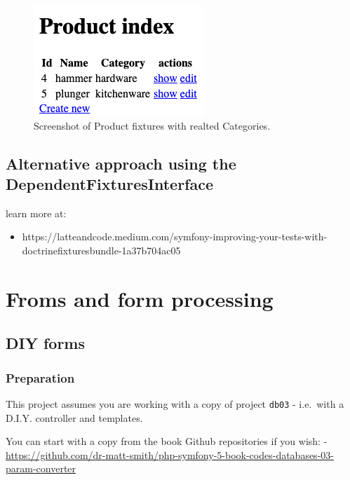 \documentclass[a4paperpaper,openright]{book}
\providecommand{\tightlist}{%
  \setlength{\itemsep}{0pt}\setlength{\parskip}{0pt}}
\begin{document}
\begin{figure}
\centering
\includegraphics{./tex2pdf.-8aed53dcd332a606/fba8c91d69bfd1f53685a580e8079091ad35c5fc.png}
\caption{Screenshot of Product fixtures with realted Categories.
\label{related_fixtures}}
\end{figure}

\hypertarget{alternative-approach-using-the-dependentfixturesinterface}{%
\chapter{Alternative approach using the
DependentFixturesInterface}\label{alternative-approach-using-the-dependentfixturesinterface}}

learn more at:

\begin{itemize}
\tightlist
\item
  https://latteandcode.medium.com/symfony-improving-your-tests-with-doctrinefixturesbundle-1a37b704ac05
\end{itemize}

\part{Froms and form processing}

\hypertarget{diy-forms}{%
\chapter{DIY forms}\label{diy-forms}}

\hypertarget{preparation}{%
\section{Preparation}\label{preparation}}

This project assumes you are working with a copy of project
\texttt{db03} - i.e.~with a D.I.Y. controller and templates.

You can start with a copy from the book Github repositories if you wish:
-
\url{https://github.com/dr-matt-smith/php-symfony-5-book-codes-databases-03-param-converter}
\end{document}
